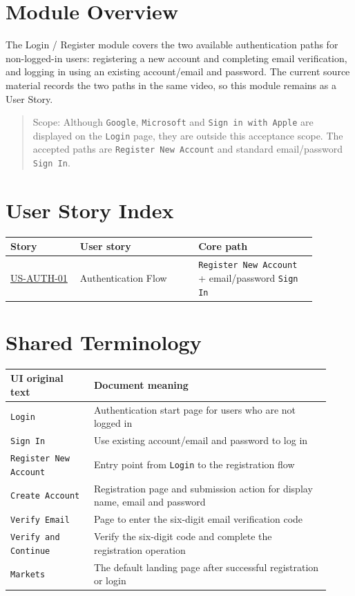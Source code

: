 \section{Module Overview}
The Login /\allowbreak{} Register module covers the two available authentication paths for non-logged-in users: registering a new account and completing email verification, and logging in using an existing account/\allowbreak{}email and password. The current source material records the two paths in the same video, so this module remains as a User Story.
\begin{quote}\small Scope: Although \texttt{Google}, \texttt{Microsoft} and \texttt{Sign in with Apple} are displayed on the \texttt{Login} page, they are outside this acceptance scope. The accepted paths are \texttt{Register New Account} and standard email/\allowbreak{}password \texttt{Sign In}.\end{quote}
\section{User Story Index}
\begingroup
\small
\begin{longtable}{L{0.20\linewidth}L{0.34\linewidth}L{0.34\linewidth}}
\toprule
\textbf{Story} & \textbf{User story} & \textbf{Core path} \\
\midrule
\hyperlink{us-auth-01}{US-AUTH-01} & Authentication Flow & \texttt{Register New Account} + email/\allowbreak{}password \texttt{Sign In} \\
\bottomrule
\end{longtable}
\endgroup
\section{Shared Terminology}
\begingroup
\small
\begin{longtable}{L{0.24\linewidth}L{0.68\linewidth}}
\toprule
\textbf{UI original text} & \textbf{Document meaning} \\
\midrule
\texttt{Login} & Authentication start page for users who are not logged in \\
\texttt{Sign In} & Use existing account/\allowbreak{}email and password to log in \\
\texttt{Register New Account} & Entry point from \texttt{Login} to the registration flow \\
\texttt{Create Account} & Registration page and submission action for display name, email and password \\
\texttt{Verify Email} & Page to enter the six-digit email verification code \\
\texttt{Verify and Continue} & Verify the six-digit code and complete the registration operation \\
\texttt{Markets} & The default landing page after successful registration or login \\
\bottomrule
\end{longtable}
\endgroup
\prdhr
\hypertarget{us-auth-01}{}
